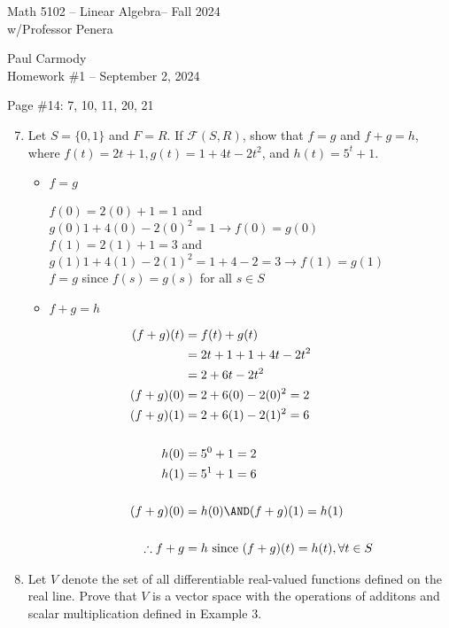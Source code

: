 \documentclass[10pt,a4paper]{report}
\newcommand{\CLASSNAME}{Math 5102 -- Linear Algebra}
\newcommand{\STUDENTNAME}{Paul Carmody}
\newcommand{\ASSIGNMENT}{Homework \#1 }
\newcommand{\DUEDATE}{September 2, 2024}
\newcommand{\SEMESTER}{Fall 2024}
\newcommand{\FF}{\mathcal{F}}
\begin{document}
\begin{center}
	\Large{\CLASSNAME -- \SEMESTER} \\
	\large{ w/Professor Penera}
\end{center}
\begin{center}
	\STUDENTNAME \\
	\ASSIGNMENT -- \DUEDATE\\
\end{center} 
Page \#14: 7, 10, 11, 20, 21\\
\begin{enumerate}
	\setcounter{enumi}{6}
	\item Let $S = \{0,1\}$ and $F=R$.  If $\FF(S,R)$, show that $f=g$ and $f+g=h$, where $f(t) = 2t+1, g(t)=1+4t-2t^2$, and $h(t) = 5^t+1$.
	\begin{itemize}
		\item $f=g$
		
		$f(0)= 2(0)+1=1$ and $g(0)1+4(0)-2(0)^2=1 \to f(0) = g(0)$\\
		$f(1)= 2(1)+1=3$ and $g(1)1+4(1)-2(1)^2=1+4-2=3 \to f(1) = g(1)$\\
		$f=g$ since $f(s)=g(s)$ for all $s \in S$
		
		\item $f+g = h$
		
		\begin{align*}
			(f+g)(t) &= f(t)+g(t)\\
			&=2t+1+1+4t-2t^2 \\
			&= 2+6t-2t^2 \\
			(f+g)(0) &= 2+6(0)-2(0)^2 = 2 \\
			(f+g)(1) &= 2+6(1)-2(1)^2 = 6 \\ \\
			h(0) &= 5^0+1 = 2 \\
			h(1) &= 5^1+1 = 6 \\ \\
			(f+g)(0) &= h(0) \AND (f+g)(1) = h(1) \\ \\
			\therefore f+g &= h \text{ since } (f+g)(t) = h(t), \forall t \in S
		\end{align*}
	\end{itemize}
	
	\setcounter{enumi}{9}
	\item Let $V$ denote the set of all differentiable real-valued functions defined on the real line.  Prove that $V$ is a vector space with the operations of additons and scalar multiplication defined in Example 3.
	

\end{enumerate}
\end{document}

